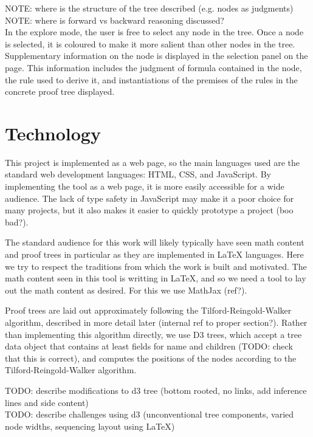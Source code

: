 \documentclass[conference]{IEEEtran}
\begin{document}
NOTE: where is the structure of the tree described (e.g. nodes as judgments) \\

NOTE: where is forward vs backward reasoning discussed? \\

In the explore mode, the user is free to select any node in the tree. Once a node is selected, it is coloured to make it more salient than other nodes in the tree. Supplementary information on the node is displayed in the selection panel on the page. This information includes the judgment of formula contained in the node, the rule used to derive it, and instantiations of the premises of the rules in the concrete proof tree displayed.

\section{Technology}

This project is implemented as a web page, so the main languages used are the standard web development languages: HTML, CSS, and JavaScript. By implementing the tool as a web page, it is more easily accessible for a wide audience. The lack of type safety in JavaScript may make it a poor choice for many projects, but it also makes it easier to quickly prototype a project (boo bad?).

The standard audience for this work will likely typically have seen math content and proof trees in particular as they are implemented in \LaTeX{} languages. Here we try to respect the traditions from which the work is built and motivated. The math content seen in this tool is writting in \LaTeX{}, and so we need a tool to lay out the math content as desired. For this we use MathJax (ref?).

Proof trees are laid out approximately following the Tilford-Reingold-Walker algorithm, described in more detail later (internal ref to proper section?). Rather than implementing this algorithm directly, we use D3 trees, which accept a tree data object that contains at least fields for name and children (TODO: check that this is correct), and computes the positions of the nodes according to the Tilford-Reingold-Walker algorithm.

TODO: describe modifications to d3 tree (bottom rooted, no links, add inference lines and side content) \\

TODO: describe challenges using d3 (unconventional tree components, varied node widths, sequencing layout using \LaTeX{}) \\
\end{document}
